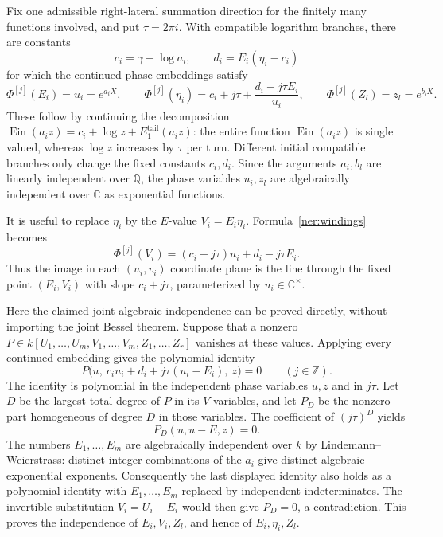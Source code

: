 \documentclass[11pt]{article}
\theoremstyle{definition}
\theoremstyle{remark}
\newcommand{\Ein}{\operatorname{Ein}}
\begin{document}
Fix one admissible right-lateral summation direction for the
finitely many functions involved, and put $\tau=2\pi i$.
With compatible logarithm branches, there are constants
\[
 c_i=\gamma+\log a_i,\qquad
 d_i=E_i(\eta_i-c_i)
\]
for which the continued phase embeddings satisfy
\begin{equation}\label{ner:windings}
 \Phi^{[j]}(E_i)=u_i=e^{a_iX},\qquad
 \Phi^{[j]}(\eta_i)
       =c_i+j\tau+\frac{d_i-j\tau E_i}{u_i},\qquad
 \Phi^{[j]}(Z_l)=z_l=e^{b_lX}.
\end{equation}
These follow by continuing the decomposition
$\Ein(a_i z)=c_i+\log z+E_1^{\mathrm{tail}}(a_i z)$:
the entire function $\Ein(a_i z)$ is single valued,
whereas $\log z$ increases by $\tau$ per turn.  Different initial
compatible branches only change the fixed constants $c_i,d_i$.
Since the arguments $a_i,b_l$ are linearly independent over
$\mathbb Q$, the phase variables $u_i,z_l$ are algebraically
independent over $\mathbb C$ as exponential functions.

It is useful to replace $\eta_i$ by the $E$-value
$V_i=E_i\eta_i$.  Formula~\eqref{ner:windings} becomes
\begin{equation}\label{ner:line-image}
 \Phi^{[j]}(V_i)
       =(c_i+j\tau)u_i+d_i-j\tau E_i.
\end{equation}
Thus the image in each $(u_i,v_i)$ coordinate plane is the line
through the fixed point $(E_i,V_i)$ with slope $c_i+j\tau$,
parameterized by $u_i\in\mathbb C^\times$.

Here the claimed joint algebraic independence can be proved
directly, without importing the joint Bessel theorem.  Suppose
that a nonzero $P\in k[U_1,\ldots,U_m,V_1,\ldots,V_m,
Z_1,\ldots,Z_r]$ vanishes at these values.  Applying every
continued embedding gives the polynomial identity
\[
 P\bigl(u,\ c_i u_i+d_i+j\tau(u_i-E_i),\ z\bigr)=0
 \qquad(j\in\mathbb Z).
\]
The identity is polynomial in the independent phase variables
$u,z$ and in $j\tau$.  Let $D$ be the largest total degree of
$P$ in its $V$ variables, and let $P_D$ be the nonzero part
homogeneous of degree $D$ in those variables.  The coefficient
of $(j\tau)^D$ yields
\[
 P_D(u,u-E,z)=0.
\]
The numbers $E_1,\ldots,E_m$ are algebraically independent over
$k$ by Lindemann--Weierstrass: distinct integer combinations of
the $a_i$ give distinct algebraic exponential exponents.
Consequently the last displayed identity also holds as a
polynomial identity with $E_1,\ldots,E_m$ replaced by independent
indeterminates.  The invertible substitution $V_i=U_i-E_i$
would then give $P_D=0$, a contradiction.  This proves the
independence of $E_i,V_i,Z_l$, and hence of $E_i,\eta_i,Z_l$.
\end{document}
